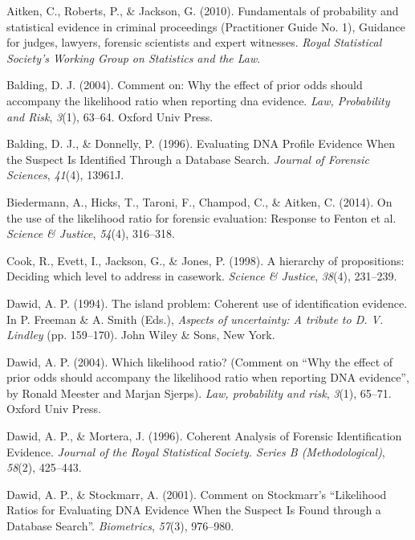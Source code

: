 \documentclass[10pt,dvipsnames,enabledeprecatedfontcommands]{scrartcl}
\begin{document}
\hypertarget{refs}{}
\hypertarget{ref-aitken2010fundamentals}{}
Aitken, C., Roberts, P., \& Jackson, G. (2010). Fundamentals of
probability and statistical evidence in criminal proceedings
(Practitioner Guide No. 1), Guidance for judges, lawyers, forensic
scientists and expert witnesses. \emph{Royal Statistical Society's
Working Group on Statistics and the Law}.

\hypertarget{ref-balding2004comment}{}
Balding, D. J. (2004). Comment on: Why the effect of prior odds should
accompany the likelihood ratio when reporting dna evidence. \emph{Law,
Probability and Risk}, \emph{3}(1), 63--64. Oxford Univ Press.

\hypertarget{ref-balding1996EvaluatingDNAProfilea}{}
Balding, D. J., \& Donnelly, P. (1996). Evaluating DNA Profile Evidence
When the Suspect Is Identified Through a Database Search. \emph{Journal
of Forensic Sciences}, \emph{41}(4), 13961J.

\hypertarget{ref-biedermann2014UseLikelihoodRatio}{}
Biedermann, A., Hicks, T., Taroni, F., Champod, C., \& Aitken, C.
(2014). On the use of the likelihood ratio for forensic evaluation:
Response to Fenton et al. \emph{Science \& Justice}, \emph{54}(4),
316--318.

\hypertarget{ref-Cook1998hierarchy}{}
Cook, R., Evett, I., Jackson, G., \& Jones, P. (1998). A hierarchy of
propositions: Deciding which level to address in casework. \emph{Science
\& Justice}, \emph{38}(4), 231--239.

\hypertarget{ref-dawid1994island}{}
Dawid, A. P. (1994). The island problem: Coherent use of identification
evidence. In P. Freeman \& A. Smith (Eds.), \emph{Aspects of
uncertainty: A tribute to D. V. Lindley} (pp. 159--170). John Wiley \&
Sons, New York.

\hypertarget{ref-dawid2004likelihood}{}
Dawid, A. P. (2004). Which likelihood ratio? (Comment on ``Why the
effect of prior odds should accompany the likelihood ratio when
reporting DNA evidence'', by Ronald Meester and Marjan Sjerps).
\emph{Law, probability and risk}, \emph{3}(1), 65--71. Oxford Univ
Press.

\hypertarget{ref-dawid1996CoherentAnalysisForensic}{}
Dawid, A. P., \& Mortera, J. (1996). Coherent Analysis of Forensic
Identification Evidence. \emph{Journal of the Royal Statistical Society.
Series B (Methodological)}, \emph{58}(2), 425--443.

\hypertarget{ref-dawid2001CommentStockmarrLikelihood}{}
Dawid, A. P., \& Stockmarr, A. (2001). Comment on Stockmarr's
``Likelihood Ratios for Evaluating DNA Evidence When the Suspect Is
Found through a Database Search''. \emph{Biometrics}, \emph{57}(3),
976--980.
\end{document}
